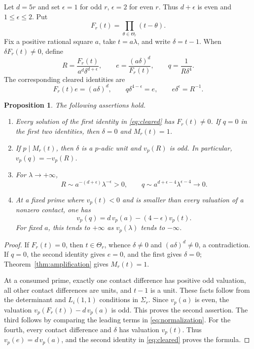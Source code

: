 \documentclass[11pt,a4paper]{article}
\newtheorem{proposition}[theorem]{Proposition}
\theoremstyle{definition}\newtheorem{definition}[theorem]{Definition}
\begin{document}
Let $d=5r$ and set $\epsilon=1$ for odd $r$, $\epsilon=2$ for even
$r$. Thus $d+\epsilon$ is even and $1\le\epsilon\le2$.
Put
\[
 F_r(t)=\prod_{\theta\in\Theta_r}(t-\theta).
\]
Fix a positive rational square $a$, take $t=a\lambda$, and write
$\delta=t-1$. When $\delta F_r(t)\ne0$, define
\begin{equation}\label{eq:normalization}
 R=\frac{F_r(t)}{a^d\delta^{d+\epsilon}},\qquad
 e=\frac{(a\delta)^d}{F_r(t)},\qquad
 q=\frac1{R\delta^4}.
\end{equation}
The corresponding cleared identities are
\begin{equation}\label{eq:cleared}
 F_r(t)e=(a\delta)^d,\qquad q\delta^{4-\epsilon}=e,
 \qquad e\delta^\epsilon=R^{-1}.
\end{equation}

\begin{proposition}\label{prop:normalization}
The following assertions hold.
\begin{enumerate}
\item Every solution of the first identity in \eqref{eq:cleared}
has $F_r(t)\ne0$. If $q=0$ in the first two identities, then
$\delta=0$ and $M_r(t)=1$.
\item If $p\mid M_r(t)$, then $\delta$ is a $p$-adic unit and
$v_p(R)$ is odd. In particular, $v_p(q)=-v_p(R)$.
\item For $\lambda\to+\infty$,
\[
 R\sim a^{-(d+\epsilon)}\lambda^{-\epsilon}>0,
 \qquad q\sim a^{d+\epsilon-4}\lambda^{\epsilon-4}\longrightarrow0.
\]
\item At a fixed prime where $v_p(t)<0$ and is smaller than every
valuation of a nonzero contact, one has
\[
 v_p(q)=d\,v_p(a)-(4-\epsilon)v_p(t).
\]
For fixed $a$, this tends to $+\infty$ as $v_p(\lambda)$ tends
to $-\infty$.
\end{enumerate}
\end{proposition}
\begin{proof}
If $F_r(t)=0$, then $t\in\Theta_r$, whence $\delta\ne0$ and
$(a\delta)^d\ne0$, a contradiction. If $q=0$, the second identity
gives $e=0$, and the first gives $\delta=0$; Theorem~\ref{thm:amplification}
gives $M_r(t)=1$.

At a consumed prime, exactly one contact difference has positive odd
valuation, all other contact differences are units, and $t-1$ is a
unit. These facts follow from the determinant and $L_i(1,1)$
conditions in $\Sigma_r$. Since $v_p(a)$ is even, the valuation
$v_p(F_r(t))-d\,v_p(a)$ is odd. This proves the second assertion.
The third follows by comparing the leading terms in
\eqref{eq:normalization}. For the fourth, every contact difference
and $\delta$ has valuation $v_p(t)$. Thus $v_p(e)=d\,v_p(a)$,
and the second identity in \eqref{eq:cleared} proves the formula.
\end{proof}
\end{document}
